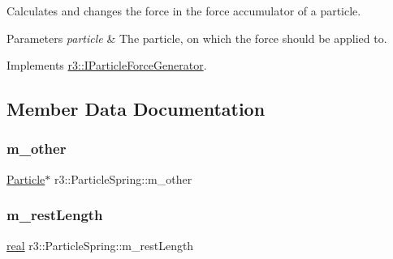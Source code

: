Calculates and changes the force in the force accumulator of a particle. 


\begin{DoxyParams}{Parameters}
{\em particle} & The particle, on which the force should be applied to. \\
\hline
\end{DoxyParams}


Implements \mbox{\hyperlink{classr3_1_1_i_particle_force_generator_af705063c5d7debca0f7a5c5c68c28f50}{r3\+::\+I\+Particle\+Force\+Generator}}.



\subsection{Member Data Documentation}
\mbox{\label{classr3_1_1_particle_spring_af24b9bb50ddd33152892d21c7fdacc8a}} 
\subsubsection{\texorpdfstring{m\+\_\+other}{m\_other}}
{\footnotesize\ttfamily \mbox{\hyperlink{classr3_1_1_particle}{Particle}}$\ast$ r3\+::\+Particle\+Spring\+::m\+\_\+other\hspace{0.3cm}{\ttfamily [protected]}}

\mbox{\label{classr3_1_1_particle_spring_a0ec4f3526a00ef338659c9ea4baf998b}} 
\subsubsection{\texorpdfstring{m\+\_\+rest\+Length}{m\_restLength}}
{\footnotesize\ttfamily \mbox{\hyperlink{namespacer3_ab2016b3e3f743fb735afce242f0dc1eb}{real}} r3\+::\+Particle\+Spring\+::m\+\_\+rest\+Length\hspace{0.3cm}{\ttfamily [protected]}}

\mbox{\label{classr3_1_1_particle_spring_ad7386065bad41fc076f6882856923db7}} 
